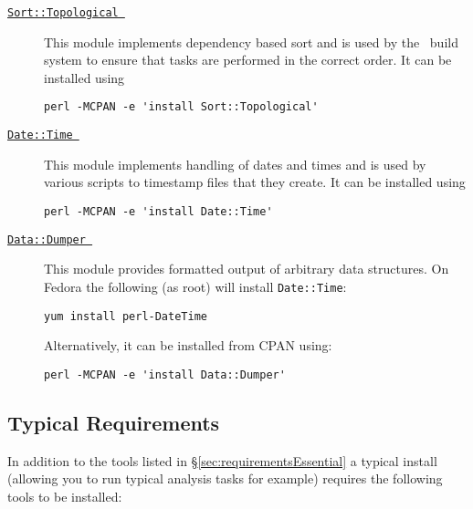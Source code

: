 \begin{description}
\item [\href{http://search.cpan.org/~kstephens/Data-Match-0.06/lib/Sort/Topological.pm}{{\tt Sort::Topological }}] This module implements dependency based sort and is used by the \glc\ build system to ensure that tasks are performed in the correct order. It can be installed using
\begin{verbatim}
perl -MCPAN -e 'install Sort::Topological'
\end{verbatim}

\item [\href{http://search.cpan.org/~drolsky/DateTime-0.70/lib/DateTime.pm}{{\tt Date::Time }}] This module implements handling of dates and times and is used by various scripts to timestamp files that they create. It can be installed using
\begin{verbatim}
perl -MCPAN -e 'install Date::Time'
\end{verbatim}

\item [\href{http://search.cpan.org/~smueller/Data-Dumper-2.131/Dumper.pm}{{\tt Data::Dumper }}] This module provides formatted output of arbitrary data structures. On Fedora the following (as root) will install {\tt Date::Time}:
\begin{verbatim}
yum install perl-DateTime
\end{verbatim}
Alternatively, it can be installed from CPAN using:
\begin{verbatim}
perl -MCPAN -e 'install Data::Dumper'
\end{verbatim}
\end{description}

\subsection{Typical Requirements}\label{sec:requirementsTypical}

In addition to the tools listed in \S\ref{sec:requirementsEssential} a typical install (allowing you to run typical analysis tasks for example) requires the following tools to be installed:

